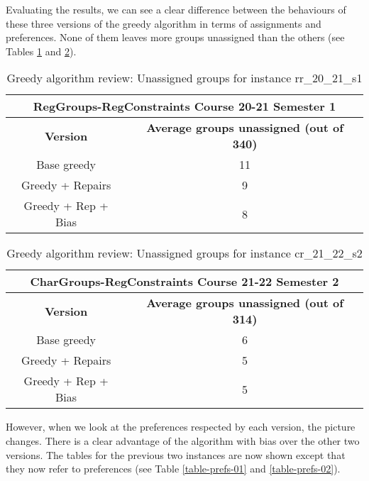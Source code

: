 Evaluating the results, we can see a clear difference between the behaviours of these three versions of the greedy algorithm in terms of assignments and preferences. None of them leaves more groups unassigned than the others (see Tables \ref{table-assign-01} and \ref{table-assign-02}). 


\begin{table}[H]
    \centering
    \caption{Greedy algorithm review: Unassigned groups for instance rr\_20\_21\_s1}
    \label{table-assign-01}
    \begin{tabular}{|c|c|}
        \hline
        \multicolumn{2}{|c|}{\textbf{RegGroups-RegConstraints Course 20-21 Semester 1}} \\
        \hline
        \textbf{Version} & \textbf{Average groups unassigned (out of 340)} \\
        \hline
        \rowcolor{blue!30}
        Base greedy & 11 \\
        \rowcolor{blue!10}
        Greedy + Repairs & 9 \\
        \rowcolor{blue!30}
        Greedy + Rep + Bias & 8 \\
        \hline
    \end{tabular}
\end{table}


\begin{table}[H]
    \centering
    \caption{Greedy algorithm review: Unassigned groups for instance cr\_21\_22\_s2}
    \label{table-assign-02}
    \begin{tabular}{|c|c|}
        \hline
        \multicolumn{2}{|c|}{\textbf{CharGroups-RegConstraints Course 21-22 Semester 2}} \\
        \hline
        \textbf{Version} & \textbf{Average groups unassigned (out of 314)} \\
        \hline
        \rowcolor{blue!30}
        Base greedy & 6 \\
        \rowcolor{blue!10}
        Greedy + Repairs & 5 \\
        \rowcolor{blue!30}
        Greedy + Rep + Bias & 5 \\
        \hline
    \end{tabular}
\end{table}

However, when we look at the preferences respected by each version, the picture changes. There is a clear advantage of the algorithm with bias over the other two versions. The tables for the previous two instances are now shown except that they now refer to preferences (see Table \ref{table-prefs-01} and \ref{table-prefs-02}).


